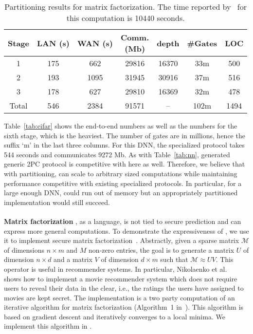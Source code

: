\begin{table}[t]
\begin{tabular}{|c|c|c|c |c|c| c|}
\hline
  Stage         &  LAN (s) & WAN (s) & \thead{Comm. \\ (Mb)}  & depth & \#Gates & LOC\\
\hline
1    &  175       & 662        & 29816       & 16370    & 33m    & 500  \\
\hline
2    &  193        & 1095        & 31945        & 30916    & 37m & 516 \\
\hline
3    &  178        & 627        & 29810        & 16369    & 32m  & 478  \\
\hline
Total    &  546      & 2384        & 91571        & --    & 102m & 1494 \\
\hline
\end{tabular}

 \caption{Partitioning results for matrix factorization. The time reported by~\cite{valeriaMatrix} for this computation is 10440 seconds.}
 \label{tab:factor} 
\end{table}
Table~\ref{tab:cifar} shows the end-to-end numbers as
well as the numbers for the sixth stage, which is the heaviest. 
The number of gates are in millions, hence the suffix `m' in the last
three columns.
For this DNN, the specialized \minion protocol takes 544 seconds and
communicates 9272 Mb.
As with Table~\ref{tab:nn}, \tool generated generic 2PC protocol is
competitive with \minion here as well. Therefore,
we believe that with partitioning, \tool can scale to arbitrary sized
computations while maintaining performance
competitive with existing specialized protocols. In particular, for a
large enough DNN, \minion could run
out of memory but an appropriately partitioned \tool implementation would still
succeed.
\\\\
\noindent\textbf{Matrix factorization}
\tool, as a language, is not tied to secure prediction and can express more general computations.
To demonstrate the expressiveness of \tool, we use it to implement secure matrix factorization~\cite{valeriaMatrix}. Abstractly, given a sparse matrix $\mathcal{M}$ of dimensions
$n\times m$ and $M$ non-zero entries, the goal is to generate a matrix $U$ of dimension $n\times d$ and a matrix
$V$ of dimension $d\times m$ such that $\mathcal{M}\approx UV$. This operator is useful in recommender systems.
In particular, Nikolaenko et al.~\cite{valeriaMatrix} shows how to implement a movie recommender system which does not require users to reveal their data in the clear, i.e., the ratings the users have assigned to movies are kept secret. The implementation is a two party computation of an iterative algorithm for matrix factorization (Algorithm~1 in~\cite{valeriaMatrix}).
This algorithm is based on gradient descent and iteratively converges to a local minima.
We implement this algorithm in \tool.
  
